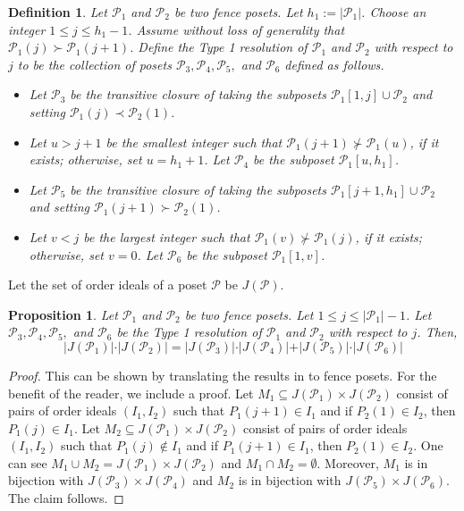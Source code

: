 \documentclass{article}
\newtheorem{definition}[theorem]{Definition}
\newtheorem{prop}[theorem]{Proposition}
\theoremstyle{remark}
\newcommand{\calP}{\mathcal{P}}
\begin{document}
\begin{definition}\label{def:ResolutionType1}
Let $\calP_1$ and $\calP_2$ be two fence posets. Let $h_1:= \vert \calP_1 \vert$. Choose an integer $1 \leq j \leq h_1 -1$. Assume without loss of generality that $\calP_1(j) \succ \calP_1(j+1)$. Define the \emph{Type 1 resolution} of $\calP_1$ and $\calP_2$ with respect to $j$ to be the collection of posets $\calP_3,\calP_4,\calP_5,$ and $\calP_6$ defined as follows.

\begin{itemize}
    \item Let $\calP_3$ be the transitive closure of taking the subposets $\calP_1[1,j] \cup \calP_2$ and setting $\calP_1(j) \prec \calP_2(1)$.
    \item Let $u > j+1$ be the smallest integer such that $\calP_1(j+1) \not\succ \calP_1(u)$, if it exists; otherwise, set $u = h_1+1$. Let $\calP_4$ be the subposet $\calP_1[u,h_1]$.
    \item Let $\calP_5$ be the transitive closure of taking the subposets $\calP_1[j+1,h_1] \cup \calP_2$ and setting $\calP_1(j+1) \succ \calP_2(1)$.
    \item Let $v<j$ be the largest integer such that $\calP_1(v) \not \succ \calP_1(j)$, if it exists; otherwise, set $v = 0$. Let $\calP_6$ be the subposet $\calP_1[1,v]$.
\end{itemize}
\end{definition}

Let the set of order ideals of a poset $\calP$ be $J(\calP)$.

\begin{prop}\label{prop:Type1Resolution}
Let $\calP_1$ and $\calP_2$ be two fence posets. Let $1 \leq j \leq \vert \calP_1 \vert - 1$. Let $\calP_3,\calP_4,\calP_5,$ and $\calP_6$ be the Type 1 resolution of $\calP_1$ and $\calP_2$ with respect to $j$. Then, \[
\vert J(\calP_1) \vert \cdot \vert J(\calP_2) \vert  = \vert J(\calP_3)\vert \cdot \vert J(\calP_4) \vert  + \vert J(\calP_5) \vert \cdot \vert J(\calP_6) \vert 
\]
\end{prop}

\begin{proof}
This can be shown by translating the results in \cite{CS13} to fence posets. For the benefit of the reader, we include a proof. Let $M_1 \subseteq J(\calP_1) \times J(\calP_2)$ consist of pairs of order ideals $(I_1,I_2)$ such that $P_1(j+1) \in I_1$ and if $P_2(1) \in I_2$, then $P_1(j) \in I_1$. Let $M_2 \subseteq J(\calP_1) \times J(\calP_2)$ consist of pairs of order ideals $(I_1,I_2)$ such that $P_1(j) \notin I_1$ and if $P_1(j+1) \in I_1$, then $P_2(1) \in I_2$. One can see $M_1 \cup M_2 = J(\calP_1) \times J(\calP_2)$ and $M_1 \cap M_2 = \emptyset$. Moreover, $M_1$ is in bijection with $J(\calP_3) \times J(\calP_4)$ and $M_2$ is in bijection with $J(\calP_5) \times J(\calP_6)$. The claim follows.
\end{proof}
\end{document}
